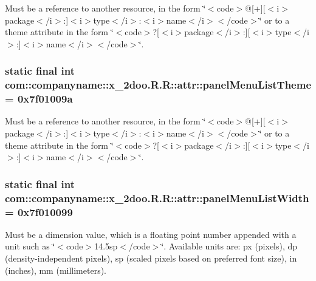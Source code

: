 Must be a reference to another resource, in the form \char`\"{}$<$code$>$@\mbox{[}+\mbox{]}\mbox{[}$<$i$>$package$<$/i$>$:\mbox{]}$<$i$>$type$<$/i$>$:$<$i$>$name$<$/i$>$$<$/code$>$\char`\"{} or to a theme attribute in the form \char`\"{}$<$code$>$?\mbox{[}$<$i$>$package$<$/i$>$:\mbox{]}\mbox{[}$<$i$>$type$<$/i$>$:\mbox{]}$<$i$>$name$<$/i$>$$<$/code$>$\char`\"{}. \hypertarget{classcom_1_1companyname_1_1x__2doo_1_1_r_1_1attr_51dd84795ab7720d1db3f8f9d0276006}{
\subsubsection[{panelMenuListTheme}]{\setlength{\rightskip}{0pt plus 5cm}static final int com::companyname::x\_\-2doo.R.R::attr::panelMenuListTheme = 0x7f01009a}}
\label{classcom_1_1companyname_1_1x__2doo_1_1_r_1_1attr_51dd84795ab7720d1db3f8f9d0276006}


Must be a reference to another resource, in the form \char`\"{}$<$code$>$@\mbox{[}+\mbox{]}\mbox{[}$<$i$>$package$<$/i$>$:\mbox{]}$<$i$>$type$<$/i$>$:$<$i$>$name$<$/i$>$$<$/code$>$\char`\"{} or to a theme attribute in the form \char`\"{}$<$code$>$?\mbox{[}$<$i$>$package$<$/i$>$:\mbox{]}\mbox{[}$<$i$>$type$<$/i$>$:\mbox{]}$<$i$>$name$<$/i$>$$<$/code$>$\char`\"{}. \hypertarget{classcom_1_1companyname_1_1x__2doo_1_1_r_1_1attr_ac2dbbab7d655ba1d20a169766cb75fe}{
\subsubsection[{panelMenuListWidth}]{\setlength{\rightskip}{0pt plus 5cm}static final int com::companyname::x\_\-2doo.R.R::attr::panelMenuListWidth = 0x7f010099}}
\label{classcom_1_1companyname_1_1x__2doo_1_1_r_1_1attr_ac2dbbab7d655ba1d20a169766cb75fe}


Must be a dimension value, which is a floating point number appended with a unit such as \char`\"{}$<$code$>$14.5sp$<$/code$>$\char`\"{}. Available units are: px (pixels), dp (density-independent pixels), sp (scaled pixels based on preferred font size), in (inches), mm (millimeters). 

